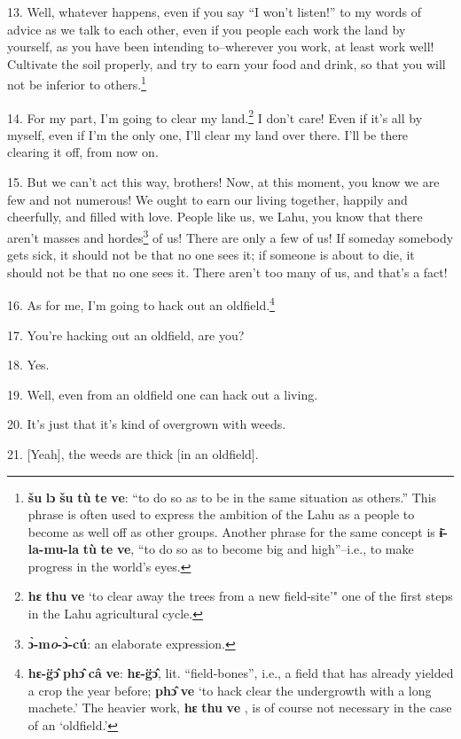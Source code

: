 13. Well, whatever happens, even if you say ``I won't listen!''
to my words of advice as we talk to each other, even if you people each work the
land by yourself, as you have been intending to--wherever you work, at least work
well! Cultivate the soil properly, and try to earn your food and drink, so that
you will not be inferior to others.\footnote{\textbf{šu} \textbf{lɔ} \textbf{šu} \textbf{tù} \textbf{te} \textbf{ve}: ``to do so as to be in the same situation as others.'' This phrase is often used to express the ambition of the Lahu as a people to become as well off as other groups. Another phrase for the same concept is \textbf{ɨ̄-la-mu-la} \textbf{tù} \textbf{te} \textbf{ve}, ``to do so as to become big and high''--i.e., to make progress in the world's eyes.}

14. For my part, I'm going to clear my land.\footnote{\textbf{hɛ} \textbf{thu} \textbf{ve} `to clear away the trees from a new field-site'" one of the first steps in the Lahu agricultural cycle.} I don't care! Even if it's all
by myself, even if I'm the only one, I'll clear my land over there. I'll be there
clearing it off, from now on.

15. But we can't act this way, brothers! Now, at this moment, you know we are few
and not numerous! We ought to earn our living together, happily and cheerfully,
and filled with love. People like us, we Lahu, you know that there aren't masses
and hordes\footnote{\textbf{ɔ̀-m\textit{\emph{o}}-ɔ̀-cú}: an elaborate expression.} of us! There are only a few of us! If someday somebody gets sick,
it should not be that no one sees it; if someone is about to die, it should not
be that no one sees it. There aren't too many of us, and that's a fact!

16. As for me, I'm going to hack out an oldfield.\footnote{\textbf{hɛ-g̈ɔ̂} \textbf{phɔ̂} \textbf{câ} \textbf{ve}: \textbf{hɛ-g̈ɔ̂}, lit. ``field-bones'', i.e., a field that has already yielded a crop the year before; \textbf{phɔ̂} \textbf{ve} `to hack clear the undergrowth with a long machete.' The heavier work, \textbf{hɛ} \textbf{thu} \textbf{ve} , is of course not necessary in the case of an `oldfield.'}

17. You're hacking out an oldfield, are you?

18. Yes.

19. Well, even from an oldfield one can hack out a living.

20. It's just that it's kind of overgrown with weeds.

21. [Yeah], the weeds are thick [in an oldfield].

